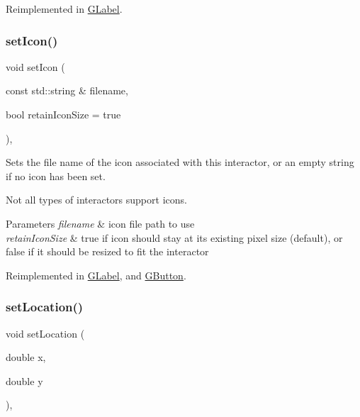 Reimplemented in \mbox{\hyperlink{classGLabel_a8a1f6693796b536d1ace7ce0ff66afee}{G\+Label}}.

\mbox{\label{classGInteractor_a762e139aa311461c3984d3ad28293f64}} 
\subsubsection{\texorpdfstring{set\+Icon()}{setIcon()}}
{\footnotesize\ttfamily void set\+Icon (\begin{DoxyParamCaption}\item[{const std\+::string \&}]{filename,  }\item[{bool}]{retain\+Icon\+Size = {\ttfamily true} }\end{DoxyParamCaption})\hspace{0.3cm}{\ttfamily [virtual]}, {\ttfamily [inherited]}}



Sets the file name of the icon associated with this interactor, or an empty string if no icon has been set. 

Not all types of interactors support icons. 
\begin{DoxyParams}{Parameters}
{\em filename} & icon file path to use \\
\hline
{\em retain\+Icon\+Size} & true if icon should stay at its existing pixel size (default), or false if it should be resized to fit the interactor \\
\hline
\end{DoxyParams}


Reimplemented in \mbox{\hyperlink{classGLabel_a75753a3d7d3364185f8088d63b664cb1}{G\+Label}}, and \mbox{\hyperlink{classGButton_a75753a3d7d3364185f8088d63b664cb1}{G\+Button}}.

\mbox{\label{classGInteractor_a04594e8ba9b98513a64f1da00dcae18c}} 
\subsubsection{\texorpdfstring{set\+Location()}{setLocation()}}
{\footnotesize\ttfamily void set\+Location (\begin{DoxyParamCaption}\item[{double}]{x,  }\item[{double}]{y }\end{DoxyParamCaption})\hspace{0.3cm}{\ttfamily [virtual]}, {\ttfamily [inherited]}}



